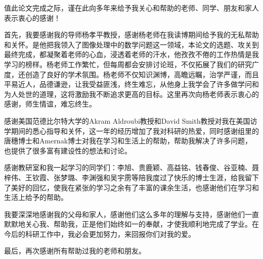 \begin{thanks}

值此论文完成之际，谨在此向多年来给予我关心和帮助的老师、同学、朋友和家人表示衷心的感谢！

首先，我要感谢我的导师杨孝平教授，感谢杨老师在我读博期间给予我的无私帮助和关怀。是他把我领入了图像处理中的数学问题这一领域，本论文的选题、攻关到最终完成，都凝聚着老师的心血，浸透着老师的汗水，他孜孜不倦的工作热情是我学习的榜样。杨老师工作繁忙，但每周都会安排讨论班，不仅拓展了我们的研究广度，还创造了良好的学术氛围。杨老师不仅知识渊博，高瞻远瞩，治学严谨，而且平易近人，品德谦逊，让我受益匪浅，终生难忘，从他身上我学会了许多做学问和为人处世的道理，这将激励我不断追求更高的目标。这里再次向杨老师表示衷心的感谢，师生情谊，难忘终生。

感谢美国范德比尔特大学的Akram Aldroubi教授和David Smith教授对我在美国访学期间的悉心指导和关怀，这一年的经历增加了我对科研的热爱，同时感谢组里的唐穗博士和Amernak博士对我在学习和生活上的帮助，帮助我解决了许多问题，也提供了很多富有建设性的想法和讨论。

感谢教研室和我一起学习的同学们：李旭、贵鹿颖、高益铭、钱春俊、谷亚楠、聂梓伟、王钦霞、张梦璐、李渊强和吴宇雳等陪我度过了快乐的博士生涯，给我留下了美好的回忆，使我在紧张的学习之余有了丰富的课余生活，也感谢他们在学习和生活上给予的帮助。

我要深深地感谢我的父母和家人，感谢他们这么多年的理解与支持，感谢他们一直默默地关心我、帮助我，正是他们始终如一的奉献，才使我顺利地完成了学业。在今后的科研工作中，我必会更加努力，来回报你们对我的爱。

最后，再次感谢所有帮助过我的老师和朋友。

\end{thanks}
